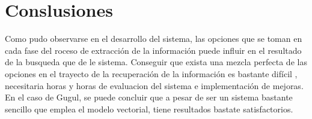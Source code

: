 \documentclass{llncs}
\begin{document}
	
	\section*{Conslusiones} 
	
	Como pudo observarse en el desarrollo del sistema, las opciones que se toman en cada fase del roceso de extracci\'on de la informaci\'on puede influir en el resultado de la busqueda que de le sistema. Conseguir que exista una mezcla perfecta de las opciones en el trayecto de la recuperaci\'on de la informaci\'on es bastante dif\'icil , necesitaria horas y horas de evaluacion del sistema e implementaci\'on de mejoras. En el caso de Gugul, se puede concluir que a pesar de ser un sistema bastante sencillo que emplea el modelo vectorial, tiene resultados bastate satisfactorios. 
	
\end{document}
